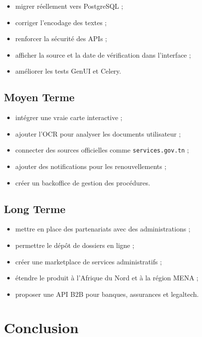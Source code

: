 \documentclass[12pt,a4paper]{report}
\begin{document}
\begin{itemize}
    \item migrer réellement vers PostgreSQL ;
    \item corriger l'encodage des textes ;
    \item renforcer la sécurité des APIs ;
    \item afficher la source et la date de vérification dans l'interface ;
    \item améliorer les tests GenUI et Celery.
\end{itemize}

\section{Moyen Terme}

\begin{itemize}
    \item intégrer une vraie carte interactive ;
    \item ajouter l'OCR pour analyser les documents utilisateur ;
    \item connecter des sources officielles comme \texttt{services.gov.tn} ;
    \item ajouter des notifications pour les renouvellements ;
    \item créer un backoffice de gestion des procédures.
\end{itemize}

\section{Long Terme}

\begin{itemize}
    \item mettre en place des partenariats avec des administrations ;
    \item permettre le dépôt de dossiers en ligne ;
    \item créer une marketplace de services administratifs ;
    \item étendre le produit à l'Afrique du Nord et à la région MENA ;
    \item proposer une API B2B pour banques, assurances et legaltech.
\end{itemize}


\chapter{Conclusion}
\end{document}
